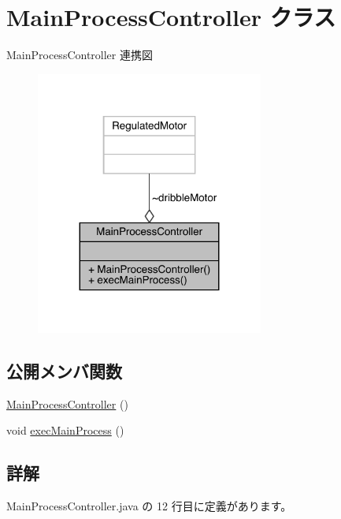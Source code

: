 \hypertarget{class_main_process_controller}{}\section{Main\+Process\+Controller クラス}
\label{class_main_process_controller}


Main\+Process\+Controller 連携図\nopagebreak
\begin{figure}[H]
\begin{center}
\leavevmode
\includegraphics[width=212pt]{df/dc7/class_main_process_controller__coll__graph}
\end{center}
\end{figure}
\subsection*{公開メンバ関数}
\begin{DoxyCompactItemize}
\item 
\mbox{\hyperlink{class_main_process_controller_af422b069cc9f6cadb45a64ef985bd536}{Main\+Process\+Controller}} ()
\item 
void \mbox{\hyperlink{class_main_process_controller_ac92bd6b23aa4c17913d6a9c63ee72739}{exec\+Main\+Process}} ()
\end{DoxyCompactItemize}


\subsection{詳解}


 Main\+Process\+Controller.\+java の 12 行目に定義があります。



